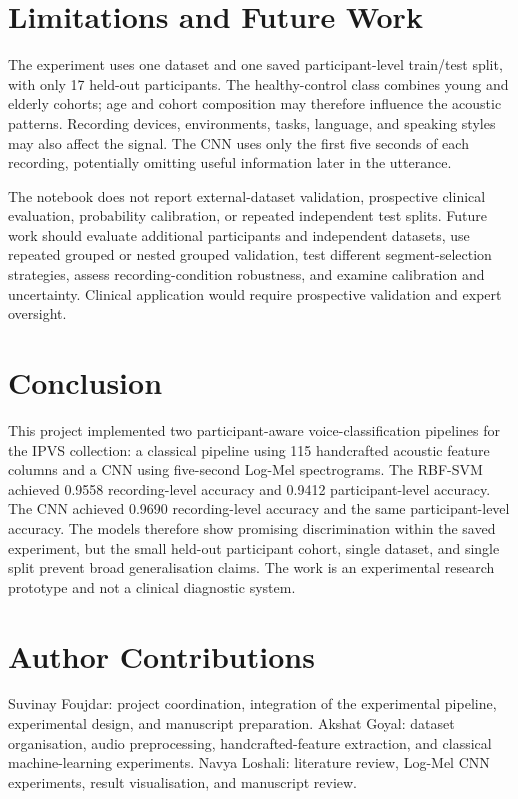 \documentclass[conference]{IEEEtran}
\begin{document}
\section{Limitations and Future Work}
The experiment uses one dataset and one saved participant-level train/test split, with only 17 held-out participants. The healthy-control class combines young and elderly cohorts; age and cohort composition may therefore influence the acoustic patterns. Recording devices, environments, tasks, language, and speaking styles may also affect the signal. The CNN uses only the first five seconds of each recording, potentially omitting useful information later in the utterance.

The notebook does not report external-dataset validation, prospective clinical evaluation, probability calibration, or repeated independent test splits. Future work should evaluate additional participants and independent datasets, use repeated grouped or nested grouped validation, test different segment-selection strategies, assess recording-condition robustness, and examine calibration and uncertainty. Clinical application would require prospective validation and expert oversight.

\section{Conclusion}
This project implemented two participant-aware voice-classification pipelines for the IPVS collection: a classical pipeline using 115 handcrafted acoustic feature columns and a CNN using five-second Log-Mel spectrograms. The RBF-SVM achieved 0.9558 recording-level accuracy and 0.9412 participant-level accuracy. The CNN achieved 0.9690 recording-level accuracy and the same participant-level accuracy. The models therefore show promising discrimination within the saved experiment, but the small held-out participant cohort, single dataset, and single split prevent broad generalisation claims. The work is an experimental research prototype and not a clinical diagnostic system.

\section*{Author Contributions}
Suvinay Foujdar: project coordination, integration of the experimental pipeline, experimental design, and manuscript preparation. Akshat Goyal: dataset organisation, audio preprocessing, handcrafted-feature extraction, and classical machine-learning experiments. Navya Loshali: literature review, Log-Mel CNN experiments, result visualisation, and manuscript review. 
\end{document}
